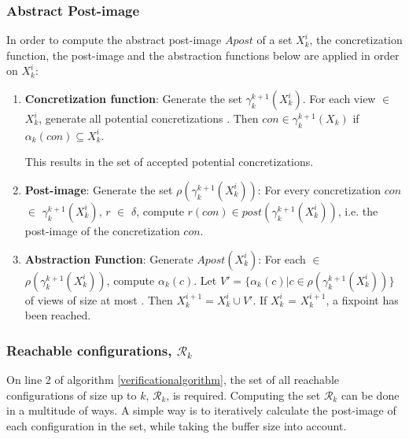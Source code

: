 \subsubsection{Abstract Post-image}
\label{part1}
In order to compute the abstract post-image $Apost$ of a set $X_k^i$, the concretization function, the post-image and the abstraction functions below are applied in order on $X_k^i$:


\begin{enumerate}
\item
\textbf{Concretization function}:
Generate the set $\gamma_k^{k+1}(X_k^i)$. For each view  $\in$ $X_k^i$, generate all potential concretizations . Then $con \in \gamma_k^{k+1}(X_k)$ if $\alpha_k(con) \subseteq X_k^i$.

This results in the set of accepted potential concretizations.

\item
\textbf{Post-image}:
Generate the set $\rho(\gamma_k^{k+1}(X_k^i))$: For every concretization $con$ $\in$ $\gamma_k^{k+1}(X_k^i)$, $r$ $\in$ $\delta$, compute $r(con) \in post(\gamma_k^{k+1}(X_k^i))$, i.e. the post-image of the concretization $con$.

\item
\textbf{Abstraction Function}:
Generate $Apost(X_k^i)$: For each  $\in$ $\rho(\gamma_k^{k+1}(X_k^i))$, compute $\alpha_k(c)$. Let $V' = \{\alpha_k(c)|c \in \rho(\gamma_k^{k+1}(X_k^i))\}$ of views of size at most . Then $X_k^{i+1} = X_k^i \cup V'$. If $X_k^i$ = $X_k^{i+1}$, a fixpoint has been reached.

\end{enumerate}

\subsubsection{Reachable configurations, $\mathcal{R}_k$}
\label{part2}
On line 2 of algorithm \ref{verificationalgorithm}, the set of all reachable configurations of size up to $k$, $\mathcal{R}_k$, is required. Computing the set $\mathcal{R}_k$ can be done in a multitude of ways. A simple way is to iteratively calculate the post-image of each configuration in the set, while taking the buffer size into account.

